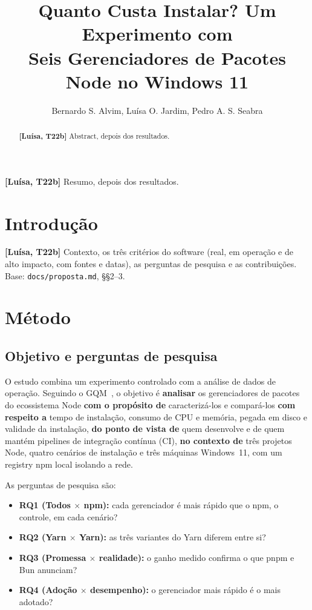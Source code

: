\documentclass[12pt]{article}
\title{Quanto Custa Instalar? Um Experimento com\\
  Seis Gerenciadores de Pacotes Node no Windows 11}
\author{Bernardo S. Alvim\inst{1}, Luísa O. Jardim\inst{1}, Pedro A. S. Seabra\inst{1}}
\newcommand{\pendente}[2]{\textcolor{red!70!black}{\textbf{[#1]} #2}}
\begin{document}
\maketitle

\begin{abstract}
  \pendente{Luísa, T22b}{Abstract, depois dos resultados.}
\end{abstract}

\begin{resumo}
  \pendente{Luísa, T22b}{Resumo, depois dos resultados.}
\end{resumo}

\section{Introdução}
\label{sec:introducao}

\pendente{Luísa, T22b}{Contexto, os três critérios do software (real, em operação e de alto
impacto, com fontes e datas), as perguntas de pesquisa e as contribuições. Base:
\texttt{docs/proposta.md}, §§2--3.}

\section{Método}
\label{sec:metodo}

\subsection{Objetivo e perguntas de pesquisa}

O estudo combina um experimento controlado com a análise de dados de operação. Seguindo o
GQM~\cite{basili1994gqm}, o objetivo é \textbf{analisar} os gerenciadores de pacotes do ecossistema
Node \textbf{com o propósito de} caracterizá-los e compará-los \textbf{com respeito a} tempo de
instalação, consumo de CPU e memória, pegada em disco e validade da instalação, \textbf{do ponto de
vista de} quem desenvolve e de quem mantém pipelines de integração contínua (CI), \textbf{no
contexto de} três projetos Node, quatro cenários de instalação e três máquinas Windows~11, com um
registry npm local isolando a rede.

As perguntas de pesquisa são:

\begin{itemize}
  \item \textbf{RQ1 (Todos $\times$ npm):} cada gerenciador é mais rápido que o npm, o controle, em
    cada cenário?
  \item \textbf{RQ2 (Yarn $\times$ Yarn):} as três variantes do Yarn diferem entre si?
  \item \textbf{RQ3 (Promessa $\times$ realidade):} o ganho medido confirma o que pnpm e Bun
    anunciam?
  \item \textbf{RQ4 (Adoção $\times$ desempenho):} o gerenciador mais rápido é o mais adotado?
\end{itemize}
\end{document}
